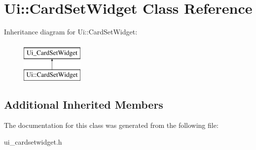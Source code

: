 \hypertarget{class_ui_1_1_card_set_widget}{}\section{Ui\+:\+:Card\+Set\+Widget Class Reference}
\label{class_ui_1_1_card_set_widget}
Inheritance diagram for Ui\+:\+:Card\+Set\+Widget\+:\begin{figure}[H]
\begin{center}
\leavevmode
\includegraphics[height=2.000000cm]{class_ui_1_1_card_set_widget}
\end{center}
\end{figure}
\subsection*{Additional Inherited Members}


The documentation for this class was generated from the following file\+:\begin{DoxyCompactItemize}
\item 
ui\+\_\+cardsetwidget.\+h\end{DoxyCompactItemize}
